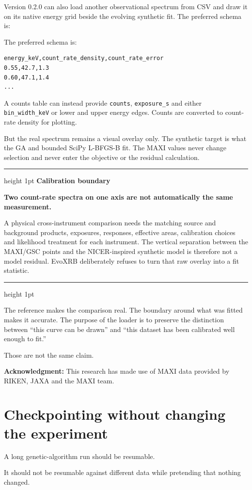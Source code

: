 \documentclass[11pt]{article}
\newenvironment{warningbox}
{%
  \begin{center}
  \begin{minipage}{0.92\linewidth}
  \color{EvoDark}
  \hrule height 1pt
  \vspace{0.55em}
  \textbf{\textcolor{EvoGreen}{Calibration boundary}}\par
  \small
}
{%
  \par\vspace{0.3em}
  \hrule height 1pt
  \end{minipage}
  \end{center}
}
\begin{document}
Version 0.2.0 can also load another observational spectrum from CSV and draw it
on its native energy grid beside the evolving synthetic fit. The preferred
schema is:

The preferred schema is:

\begin{lstlisting}
energy_keV,count_rate_density,count_rate_error
0.55,42.7,1.3
0.60,47.1,1.4
...
\end{lstlisting}

A counts table can instead provide \texttt{counts}, \texttt{exposure\_s} and
either \texttt{bin\_width\_keV} or lower and upper energy edges. Counts are
converted to count-rate density for plotting.

But the real spectrum remains a visual overlay only. The synthetic target is
what the GA and bounded SciPy L-BFGS-B fit. The MAXI values never change
selection and never enter the objective or the residual calculation.

\begin{warningbox}
\textbf{Two count-rate spectra on one axis are not automatically the same
measurement.}

A physical cross-instrument comparison needs the matching source and background
products, exposures, responses, effective areas, calibration choices and
likelihood treatment for each instrument. The vertical separation between the
MAXI/GSC points and the NICER-inspired synthetic model is therefore not a model
residual. EvoXRB deliberately refuses to turn that raw overlay into a fit
statistic.
\end{warningbox}

The reference makes the comparison real. The boundary around what was fitted
makes it accurate. The purpose of the loader is to preserve the distinction
between ``this curve can be drawn'' and ``this dataset has been calibrated well
enough to fit.''

Those are not the same claim.

\textbf{Acknowledgment:} This research has made use of MAXI data provided by
RIKEN, JAXA and the MAXI team.

\section{Checkpointing without changing the experiment}

A long genetic-algorithm run should be resumable.

It should not be resumable against different data while pretending that nothing
changed.
\end{document}
